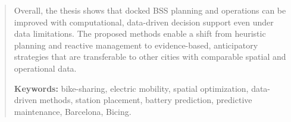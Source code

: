 \begin{abstract}
    Overall, the thesis shows that docked BSS planning and operations can be improved with computational, data-driven decision support even under data limitations. The proposed methods enable a shift from heuristic planning and reactive management to evidence-based, anticipatory strategies that are transferable to other cities with comparable spatial and operational data.
    

\textbf{Keywords:} bike-sharing, electric mobility, spatial optimization, data-driven methods, station placement, battery prediction, predictive maintenance, Barcelona, Bicing.

\end{abstract}
